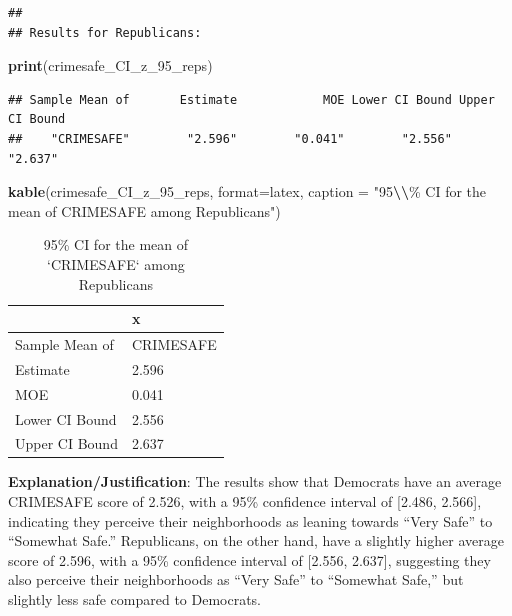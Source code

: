 \documentclass[
  11pt,
]{article}
\newenvironment{Shaded}{\begin{snugshade}}{\end{snugshade}}
\newcommand{\AttributeTok}[1]{\textcolor[rgb]{0.13,0.29,0.53}{#1}}
\newcommand{\FunctionTok}[1]{\textcolor[rgb]{0.13,0.29,0.53}{\textbf{#1}}}
\newcommand{\NormalTok}[1]{#1}
\newcommand{\SpecialCharTok}[1]{\textcolor[rgb]{0.81,0.36,0.00}{\textbf{#1}}}
\newcommand{\StringTok}[1]{\textcolor[rgb]{0.31,0.60,0.02}{#1}}
\begin{document}
\begin{verbatim}
## 
## Results for Republicans:
\end{verbatim}

\begin{Shaded}
\begin{Highlighting}[]
\FunctionTok{print}\NormalTok{(crimesafe\_CI\_z\_95\_reps)}
\end{Highlighting}
\end{Shaded}

\begin{verbatim}
## Sample Mean of       Estimate            MOE Lower CI Bound Upper CI Bound 
##    "CRIMESAFE"        "2.596"        "0.041"        "2.556"        "2.637"
\end{verbatim}

\begin{Shaded}
\begin{Highlighting}[]
\FunctionTok{kable}\NormalTok{(crimesafe\_CI\_z\_95\_reps, }\AttributeTok{format=}\StringTok{\textquotesingle{}latex\textquotesingle{}}\NormalTok{, }\AttributeTok{caption =} \StringTok{"95}\SpecialCharTok{\textbackslash{}\textbackslash{}}\StringTok{\% CI for the mean of \textasciigrave{}CRIMESAFE\textasciigrave{} among Republicans"}\NormalTok{)}
\end{Highlighting}
\end{Shaded}

\begin{table}

\caption{\label{tab:q1-d-part2}95\% CI for the mean of `CRIMESAFE` among Republicans}
\centering
\begin{tabular}[t]{l|l}
\hline
  & x\\
\hline
Sample Mean of & CRIMESAFE\\
\hline
Estimate & 2.596\\
\hline
MOE & 0.041\\
\hline
Lower CI Bound & 2.556\\
\hline
Upper CI Bound & 2.637\\
\hline
\end{tabular}
\end{table}

\textbf{Explanation/Justification}: The results show that Democrats have
an average CRIMESAFE score of 2.526, with a 95\% confidence interval of
{[}2.486, 2.566{]}, indicating they perceive their neighborhoods as
leaning towards ``Very Safe'' to ``Somewhat Safe.'' Republicans, on the
other hand, have a slightly higher average score of 2.596, with a 95\%
confidence interval of {[}2.556, 2.637{]}, suggesting they also perceive
their neighborhoods as ``Very Safe'' to ``Somewhat Safe,'' but slightly
less safe compared to Democrats.
\end{document}
